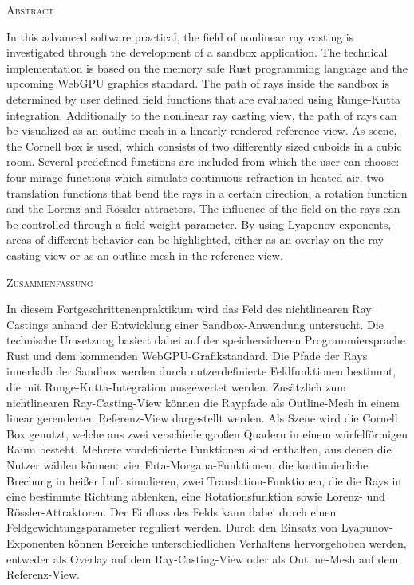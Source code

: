 \begin{center}
  \textsc{Abstract}
\end{center}
%
\noindent In this advanced software practical, the field of nonlinear ray casting is investigated through the development of a sandbox application.
The technical implementation is based on the memory safe Rust programming language and the upcoming WebGPU graphics standard.
The path of rays inside the sandbox is determined by user defined field functions that are evaluated using Runge-Kutta integration.
Additionally to the nonlinear ray casting view, the path of rays can be visualized as an outline mesh in a linearly rendered reference view.
As scene, the Cornell box is used, which consists of two differently sized cuboids in a cubic room.
Several predefined functions are included from which the user can choose: four mirage functions which simulate continuous refraction in heated air, two translation functions that bend the rays in a certain direction, a rotation function and the Lorenz and Rössler attractors.
The influence of the field on the rays can be controlled through a field weight parameter.
By using Lyaponov exponents, areas of different behavior can be highlighted, either as an overlay on the ray casting view or as an outline mesh in the reference view.

\begin{center}
  \textsc{Zusammenfassung}
\end{center}
%
\noindent In diesem Fortgeschrittenenpraktikum wird das Feld des nichtlinearen Ray Castings anhand der Entwicklung einer Sandbox-Anwendung untersucht.
Die technische Umsetzung basiert dabei auf der speichersicheren Programmiersprache Rust und dem kommenden WebGPU-Grafikstandard.
Die Pfade der Rays innerhalb der Sandbox werden durch nutzerdefinierte Feldfunktionen bestimmt, die mit Runge-Kutta-Integration ausgewertet werden.
Zusätzlich zum nichtlinearen Ray-Casting-View können die Raypfade als Outline-Mesh in einem linear gerenderten Referenz-View dargestellt werden.
Als Szene wird die Cornell Box genutzt, welche aus zwei verschiedengroßen Quadern in einem würfelförmigen Raum besteht.
Mehrere vordefinierte Funktionen sind enthalten, aus denen die Nutzer wählen können: vier Fata-Morgana-Funktionen, die kontinuierliche Brechung in heißer Luft simulieren, zwei Translation-Funktionen, die die Rays in eine bestimmte Richtung ablenken, eine Rotationsfunktion sowie Lorenz- und Rössler-Attraktoren.
Der Einfluss des Felds kann dabei durch einen Feldgewichtungsparameter reguliert werden.
Durch den Einsatz von Lyapunov-Exponenten können Bereiche unterschiedlichen Verhaltens hervorgehoben werden, entweder als Overlay auf dem Ray-Casting-View oder als Outline-Mesh auf dem Referenz-View.


